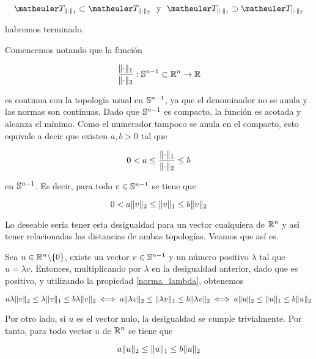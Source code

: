 \begin{equation*}
\T_{\norm{\cdot}_1}\subset\T_{\norm{\cdot}_2} \ \ \text{y} \  \	\T_{\norm{\cdot}_1}\supset\T_{\norm{\cdot}_2}
\end{equation*}

habremos terminado. 


Comencemos notando que la función 

\begin{equation*}
\frac{\lVert\cdot\rVert_1}{\lVert\cdot\rVert_2}:\mathbb{S}^{n-1}\subset \mathbb{R}^n\rightarrow \mathbb{R}
\end{equation*}

es continua con la topología usual en $\mathbb{S}^{n-1}$, ya que el denominador no se anula y las normas son continuas. Dado que $\mathbb{S}^{n-1}$ es compacto, la función es acotada y alcanza el mínimo. Como el numerador tampoco se anula en el compacto, esto equivale a decir que existen $a,b>0$ tal que

\begin{equation*}
0<a\le \frac{\lVert\cdot\rVert_1}{\lVert\cdot\rVert_2}\le b
\end{equation*}

en $\mathbb{S}^{n-1}$. Es decir, para todo $v\in\mathbb{S}^{n-1}$ se tiene que

\begin{equation*}
0<a\lVert v\rVert_2\le \lVert v\rVert_1\le b\lVert v\rVert_2
\end{equation*}

Lo deseable sería tener esta desigualdad para un vector cualquiera de $\mathbb{R}^n$ y así tener relacionadas las distancias de ambas topologías. Veamos que así es.


Sea $u\in\mathbb{R}^n\backslash\{0\}$, existe un vector $v\in \mathbb{S}^{n-1}$ y un número positivo $\lambda$ tal que $u=\lambda v$. Entonces, multiplicando por $\lambda$ en la desigualdad anterior, dado que es positivo, y utilizando la propiedad \ref{norma_lambda}, obtenemos

\begin{equation*}
a\lambda\lVert v\rVert_2\le \lambda\lVert v\rVert_1\le b\lambda\lVert v\rVert_2\iff a\lVert\lambda v\rVert_2\le \lVert\lambda v\rVert_1\le b\lVert\lambda v\rVert_2\iff a\lVert u\rVert_2\le \lVert u\rVert_1\le b\lVert u\rVert_2
\end{equation*}

Por otro lado, si $u$ es el vector nulo, la desigualdad se cumple trivialmente. Por tanto, para todo vector $u$ de $\mathbb{R}^n$ se tiene que

\begin{equation}\label{desigualdad_normas}
a\lVert u\rVert_2\le \lVert u\rVert_1\le b\lVert u\rVert_2
\end{equation}


